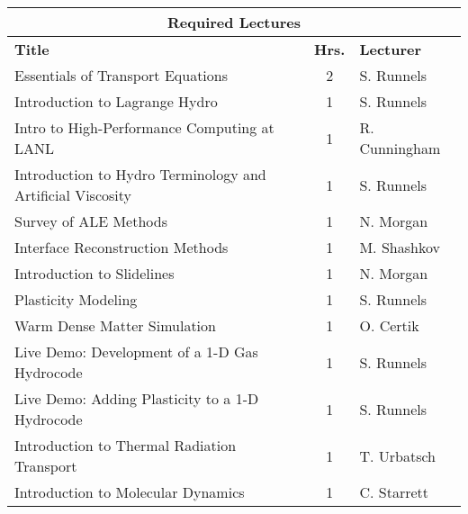 \begin{small}
\begin{center}
  \begin{tabular}{ |  l | c | l |  }
    \hline
\multicolumn{3}{|c|}{\bf{Required Lectures}} \\ \hline
\bf{Title}                                                                 &\bf{Hrs.}          &  \bf{Lecturer}                  \\ \hline \hline
Essentials of Transport Equations                                          &    2              &  S. Runnels                     \\ 
Introduction to Lagrange Hydro                                             &    1              &  S. Runnels                     \\ 
Intro to High-Performance Computing at LANL                                &    1              &  R. Cunningham                  \\ 
Introduction to Hydro Terminology and Artificial Viscosity                 &    1              &  S. Runnels                     \\ 
Survey of ALE Methods                                                      &    1              &  N. Morgan                      \\ 
Interface Reconstruction Methods                                           &    1              &  M. Shashkov                    \\ 
Introduction to Slidelines                                                 &    1              &  N. Morgan                      \\ 
Plasticity Modeling                                                        &    1              &  S. Runnels                     \\ 
Warm Dense Matter Simulation                                               &    1              &  O. Certik                      \\ 
Live Demo: Development of a 1-D Gas Hydrocode                              &    1              &  S. Runnels                     \\ 
Live Demo: Adding Plasticity to a 1-D Hydrocode                            &    1              &  S. Runnels                     \\ 
Introduction to Thermal Radiation Transport                                &    1              &  T. Urbatsch                    \\ 
Introduction to Molecular Dynamics                                         &    1              &  C. Starrett                    \\ 

\end{tabular}
\end{center}
\end{small}
